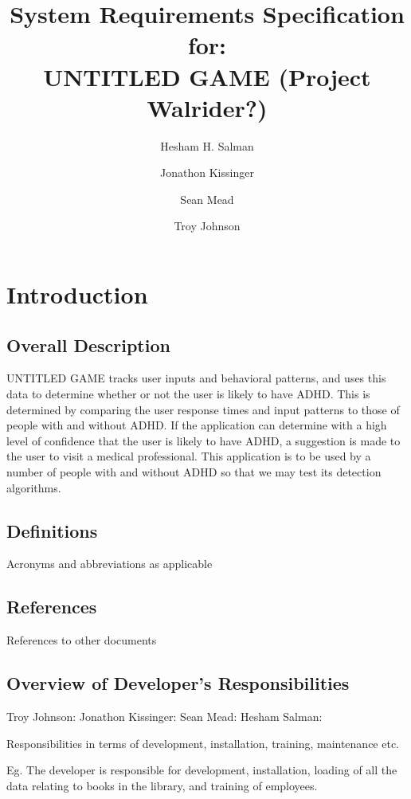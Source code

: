 \documentclass[a4wide]{article}
\title{System Requirements Specification for:\\ UNTITLED GAME (Project Walrider?)}
\author{Hesham H. Salman \and Jonathon Kissinger \and Sean Mead \and Troy Johnson}
\begin{document}
\maketitle

\section{Introduction}

\subsection{Overall Description}

UNTITLED GAME tracks user inputs and behavioral patterns, and uses this data to determine whether or not the user is likely to have ADHD. This is determined by comparing the user response times and input patterns to those of people with and without ADHD. If the application can determine with a high level of confidence that the user is likely to have ADHD, a suggestion is made to the user to visit a medical professional. \newline \newline
This application is to be used by a number of people with and without ADHD so that we may test its detection algorithms. 

\subsection{Definitions}

Acronyms and abbreviations as applicable

\subsection{References}

References to other documents

\subsection{Overview of Developer's Responsibilities}


Troy Johnson: 
Jonathon Kissinger:
Sean Mead:
Hesham Salman:

Responsibilities in terms of development, installation, training, maintenance
etc.

Eg. The developer is responsible for development, installation,
loading of all the data relating to books in the library,
and training of employees.
\end{document}
